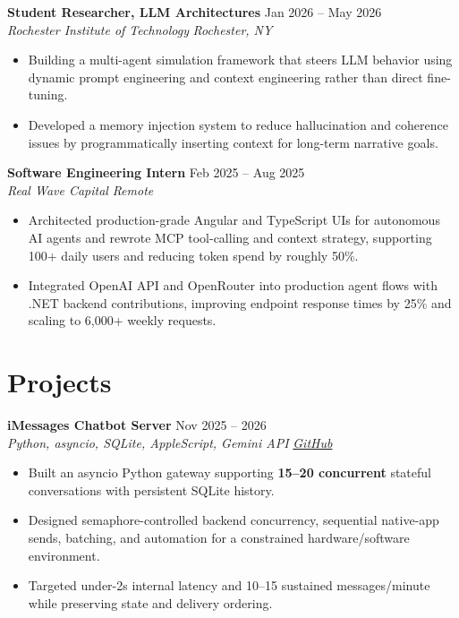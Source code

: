 \documentclass[10pt,letterpaper]{article}
\newif\ifresumeFirstRole
\newcommand{\resumeRole}[4]{%
  \ifresumeFirstRole
    \global\resumeFirstRolefalse
  \else
    \vspace{0pt plus 1fill}%
  \fi
  \textbf{#1} \hfill #2\\
  \textit{#3} \hfill \textit{#4}
}
\begin{document}
\resumeRole{Student Researcher, LLM Architectures}{Jan 2026 -- May 2026}{Rochester Institute of Technology}{Rochester, NY}
\begin{itemize}
  \item Building a multi-agent simulation framework that steers LLM behavior using dynamic prompt engineering and context engineering rather than direct fine-tuning.
  \item Developed a memory injection system to reduce hallucination and coherence issues by programmatically inserting context for long-term narrative goals.
\end{itemize}

\resumeRole{Software Engineering Intern}{Feb 2025 -- Aug 2025}{Real Wave Capital}{Remote}
\begin{itemize}
  \item Architected production-grade Angular and TypeScript UIs for autonomous AI agents and rewrote MCP tool-calling and context strategy, supporting 100+ daily users and reducing token spend by roughly 50\%.
  \item Integrated OpenAI API and OpenRouter into production agent flows with .NET backend contributions, improving endpoint response times by 25\% and scaling to 6,000+ weekly requests.
\end{itemize}

\section*{Projects}
\resumeRole{iMessages Chatbot Server}{Nov 2025 -- 2026}{Python, asyncio, SQLite, AppleScript, Gemini API}{\href{https://github.com/alextyhwang/iMessages-Chatbot-Server}{GitHub}}
\begin{itemize}
  \item Built an asyncio Python gateway supporting \textbf{15--20 concurrent} stateful conversations with persistent SQLite history.
  \item Designed semaphore-controlled backend concurrency, sequential native-app sends, batching, and automation for a constrained hardware/software environment.
  \item Targeted under-2s internal latency and 10--15 sustained messages/minute while preserving state and delivery ordering.
\end{itemize}
\end{document}
